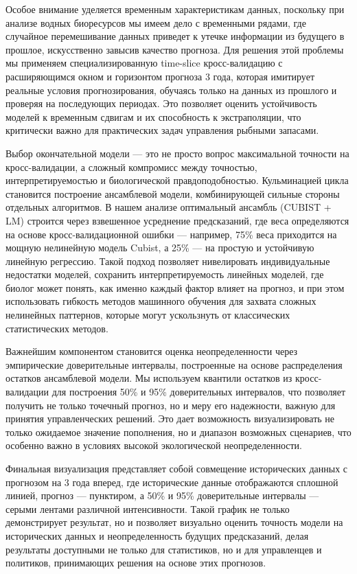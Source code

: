 \documentclass[
  letterpaper,
  DIV=11,
  numbers=noendperiod]{scrreprt}
\begin{document}
Особое внимание уделяется временным характеристикам данных, поскольку
при анализе водных биоресурсов мы имеем дело с временными рядами, где
случайное перемешивание данных приведет к утечке информации из будущего
в прошлое, искусственно завысив качество прогноза. Для решения этой
проблемы мы применяем специализированную time-slice кросс-валидацию с
расширяющимся окном и горизонтом прогноза 3 года, которая имитирует
реальные условия прогнозирования, обучаясь только на данных из прошлого
и проверяя на последующих периодах. Это позволяет оценить устойчивость
моделей к временным сдвигам и их способность к экстраполяции, что
критически важно для практических задач управления рыбными запасами.

Выбор окончательной модели --- это не просто вопрос максимальной
точности на кросс-валидации, а сложный компромисс между точностью,
интерпретируемостью и биологической правдоподобностью. Кульминацией
цикла становится построение ансамблевой модели, комбинирующей сильные
стороны отдельных алгоритмов. В нашем анализе оптимальный ансамбль
(CUBIST + LM) строится через взвешенное усреднение предсказаний, где
веса определяются на основе кросс-валидационной ошибки --- например,
75\% веса приходится на мощную нелинейную модель Cubist, а 25\% --- на
простую и устойчивую линейную регрессию. Такой подход позволяет
нивелировать индивидуальные недостатки моделей, сохранить
интерпретируемость линейных моделей, где биолог может понять, как именно
каждый фактор влияет на прогноз, и при этом использовать гибкость
методов машинного обучения для захвата сложных нелинейных паттернов,
которые могут ускользнуть от классических статистических методов.

Важнейшим компонентом становится оценка неопределенности через
эмпирические доверительные интервалы, построенные на основе
распределения остатков ансамблевой модели. Мы используем квантили
остатков из кросс-валидации для построения 50\% и 95\% доверительных
интервалов, что позволяет получить не только точечный прогноз, но и меру
его надежности, важную для принятия управленческих решений. Это дает
возможность визуализировать не только ожидаемое значение пополнения, но
и диапазон возможных сценариев, что особенно важно в условиях высокой
экологической неопределенности.

Финальная визуализация представляет собой совмещение исторических данных
с прогнозом на 3 года вперед, где исторические данные отображаются
сплошной линией, прогноз --- пунктиром, а 50\% и 95\% доверительные
интервалы --- серыми лентами различной интенсивности. Такой график не
только демонстрирует результат, но и позволяет визуально оценить
точность модели на исторических данных и неопределенность будущих
предсказаний, делая результаты доступными не только для статистиков, но
и для управленцев и политиков, принимающих решения на основе этих
прогнозов.
\end{document}
